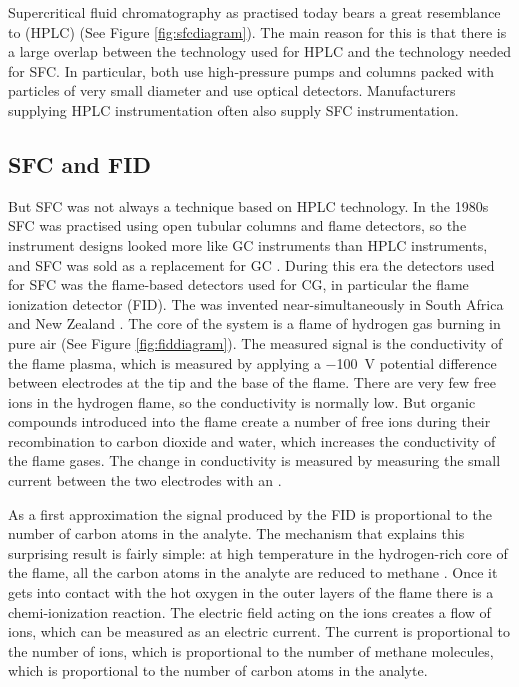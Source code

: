 Supercritical fluid chromatography as practised today bears a great resemblance
to  (HPLC) (See Figure
\ref{fig:sfcdiagram}). The main reason for this is that there is a large overlap
between the technology used for HPLC and the technology needed for SFC. In
particular, both use high-pressure pumps and columns packed with particles of
very small diameter and use optical detectors. Manufacturers supplying HPLC
instrumentation often also supply SFC instrumentation.

\subsection{SFC and FID}
\label{sec:FID}

But SFC was not always a technique based on HPLC technology. In the 1980s SFC
was practised using open tubular columns and flame detectors, so the instrument
designs looked more like GC instruments than HPLC instruments, and SFC was sold
as a replacement for GC \autocite{Poole2003}. During this era the detectors used
for SFC was the flame-based detectors used for CG, in particular the flame
ionization detector (FID). The  was invented
near-simultaneously in South Africa and New Zealand \autocite{Ettre2008}. The
core of the system is a flame of hydrogen gas burning in pure air (See Figure
\ref{fig:fiddiagram}). The measured signal is the conductivity of the flame
plasma, which is measured by applying a \SI{-100}{\volt} potential difference
between electrodes at the tip and the base of the flame. There are very few free
ions in the hydrogen flame, so the conductivity is normally low. But organic
compounds introduced into the flame create a number of free ions during their
recombination to carbon dioxide and water, which increases the conductivity of
the flame gases. The change in conductivity is measured by measuring the small
current between the two electrodes with an .

As a first approximation the signal produced by the FID is proportional to the
number of carbon atoms in the analyte. The mechanism that explains this
surprising result is fairly simple: at high temperature in the hydrogen-rich
core of the flame, all the carbon atoms in the analyte are reduced to methane
\autocite{Holm1996}. Once it gets into contact with the hot oxygen in the outer
layers of the flame there is a chemi-ionization reaction. The electric field
acting on the ions creates a flow of ions, which can be measured as an electric
current. The current is proportional to the number of ions, which is
proportional to the number of methane molecules, which is proportional to the
number of carbon atoms in the analyte.

